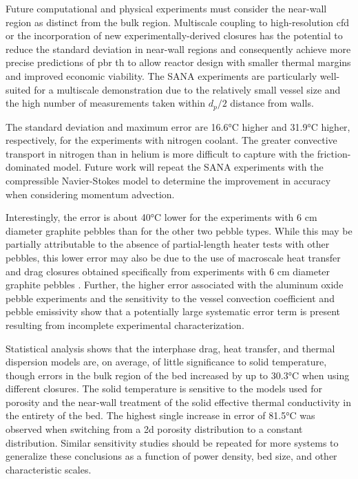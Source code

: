 Future computational and physical experiments must consider the near-wall region as distinct from the bulk region. Multiscale coupling to high-resolution \gls{cfd} or the incorporation of new experimentally-derived closures has the potential to reduce the standard deviation in near-wall regions and consequently achieve more precise predictions of \gls{pbr} \gls{th} to allow reactor design with smaller thermal margins and improved economic viability. The SANA experiments are particularly well-suited for a multiscale demonstration due to the relatively small vessel size and the high number of measurements taken within \(d_p/2\) distance from walls.

The standard deviation and maximum error are 16.6\si{\celsius} higher and 31.9\si{\celsius} higher, respectively, for the experiments with nitrogen coolant. The greater convective transport in nitrogen than in helium is more difficult to capture with the friction-dominated model. Future work will repeat the SANA experiments with the compressible Navier-Stokes model to determine the improvement in accuracy when considering momentum advection.

Interestingly, the error is about 40\si{\celsius} lower for the experiments with 6 \si{\centi\meter} diameter graphite pebbles than for the other two pebble types. While this may be partially attributable to the absence of partial-length heater tests with other pebbles, this lower error may also be due to the use of macroscale heat transfer and drag closures obtained specifically from experiments with 6 \si{\centi\meter} diameter graphite pebbles \cite{KTA,KTAhtc}. Further, the higher error associated with the aluminum oxide pebble experiments and the sensitivity to the vessel convection coefficient and pebble emissivity show that a potentially large systematic error term is present resulting from incomplete experimental characterization.

Statistical analysis shows that the interphase drag, heat transfer, and thermal dispersion models are, on average, of little significance to solid temperature, though errors in the bulk region of the bed increased by up to 30.3\si{\celsius} when using different closures. The solid temperature is sensitive to the models used for porosity and the near-wall treatment of the solid effective thermal conductivity in the entirety of the bed. The highest single increase in error of 81.5\si{\celsius} was observed when switching from a \gls{2d} porosity distribution to a constant distribution. Similar sensitivity studies should be repeated for more systems to generalize these conclusions as a function of power density, bed size, and other characteristic scales.
